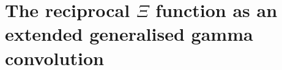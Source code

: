 \chapter{The reciprocal \texorpdfstring{$\Xi$}{Xi} function as an extended generalised gamma convolution}\label{vol1:ch7}

